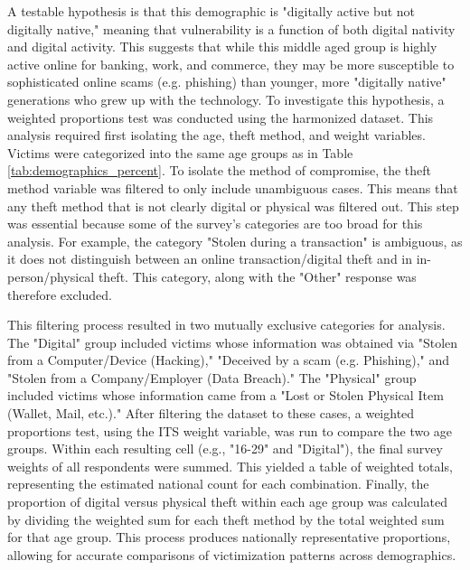 A testable hypothesis is that this demographic is "digitally active but not digitally native," meaning that vulnerability is a function of both digital nativity and digital activity. This suggests that while this middle aged group is highly active online for banking, work, and commerce, they may be more susceptible to sophisticated online scams (e.g. phishing) than younger, more "digitally native" generations who grew up with the technology. To investigate this hypothesis, a weighted proportions test was conducted using the harmonized dataset. This analysis required first isolating the age, theft method, and weight variables. Victims were categorized into the same age groups as in Table \ref{tab:demographics_percent}. To isolate the method of compromise, the theft method variable was filtered to only include unambiguous cases. This means that any theft method that is not clearly digital or physical was filtered out. This step was essential because some of the survey's categories are too broad for this analysis. For example, the category "Stolen during a transaction" is ambiguous, as it does not distinguish between an online transaction/digital theft and in in-person/physical theft. This category, along with the "Other" response was therefore excluded. 

This filtering process resulted in two mutually exclusive categories for analysis. The "Digital" group included victims whose information was obtained via "Stolen from a Computer/Device (Hacking)," "Deceived by a scam (e.g. Phishing)," and "Stolen from a Company/Employer (Data Breach)." The "Physical" group included victims whose information came from a "Lost or Stolen Physical Item (Wallet, Mail, etc.)." After filtering the dataset to these cases, a weighted proportions test, using the ITS weight variable, was run to compare the two age groups. Within each resulting cell (e.g., "16-29" and "Digital"), the final survey weights of all respondents were summed. This yielded a table of weighted totals, representing the estimated national count for each combination. Finally, the proportion of digital versus physical theft within each age group was calculated by dividing the weighted sum for each theft method by the total weighted sum for that age group. This process produces nationally representative proportions, allowing for accurate comparisons of victimization patterns across demographics.

